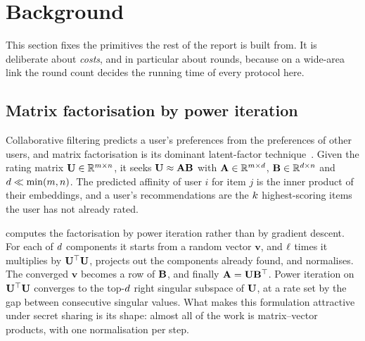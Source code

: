 \section{Background}
\label{sec:background}

This section fixes the primitives the rest of the report is built from. It is
deliberate about \emph{costs}, and in particular about rounds, because on a
wide-area link the round count decides the running time of every protocol here.

\subsection{Matrix factorisation by power iteration}
\label{sec:background:mf}

Collaborative filtering predicts a user's preferences from the preferences of
other users, and matrix factorisation is its dominant latent-factor
technique~\cite{koren2009,hu2008}. Given the rating matrix $\mathbf{U} \in
\mathbb{R}^{m \times n}$, it seeks $\mathbf{U} \approx \mathbf{A} \mathbf{B}$
with $\mathbf{A} \in \mathbb{R}^{m \times d}$, $\mathbf{B} \in \mathbb{R}^{d \times
n}$ and $d \ll \min(m, n)$. The predicted affinity of user $i$
for item $j$ is the inner product of their embeddings, and a user's
recommendations are the $k$ highest-scoring items the user has not already
rated.

\nudgeplain{} computes the factorisation by power iteration rather than by
gradient descent. For each of $d$ components it starts from a random vector
$\mathbf{v}$, and $\ell$ times it multiplies by $\mathbf{U}^{\top}\mathbf{U}$,
projects out the components already found, and normalises. The converged
$\mathbf{v}$ becomes a row of $\mathbf{B}$, and finally $\mathbf{A} =
\mathbf{U}\mathbf{B}^{\top}$. Power iteration on $\mathbf{U}^{\top}\mathbf{U}$
converges to the top-$d$ right singular subspace of $\mathbf{U}$, at a rate set
by the gap between consecutive singular values. What makes this formulation
attractive under secret sharing is its shape: almost all of the work is
matrix--vector products, with one normalisation per step.

